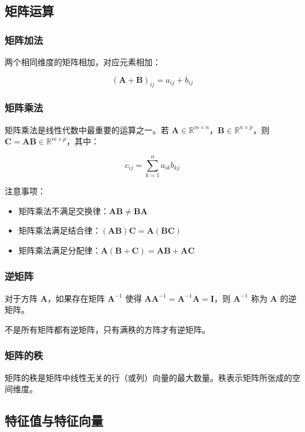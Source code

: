 \documentclass[12pt,UTF8]{ctexbook}
\begin{document}
\subsection{矩阵运算}

\subsubsection{矩阵加法}

两个相同维度的矩阵相加，对应元素相加：

$$(\mathbf{A} + \mathbf{B})_{ij} = a_{ij} + b_{ij}$$

\subsubsection{矩阵乘法}

矩阵乘法是线性代数中最重要的运算之一。若 $\mathbf{A} \in \mathbb{R}^{m \times n}$，$\mathbf{B} \in \mathbb{R}^{n \times p}$，则 $\mathbf{C} = \mathbf{A}\mathbf{B} \in \mathbb{R}^{m \times p}$，其中：

$$c_{ij} = \sum_{k=1}^{n} a_{ik}b_{kj}$$

注意事项：
\begin{itemize}[leftmargin=2cm]
    \item 矩阵乘法不满足交换律：$\mathbf{AB} \neq \mathbf{BA}$
    \item 矩阵乘法满足结合律：$(\mathbf{AB})\mathbf{C} = \mathbf{A}(\mathbf{BC})$
    \item 矩阵乘法满足分配律：$\mathbf{A}(\mathbf{B} + \mathbf{C}) = \mathbf{AB} + \mathbf{AC}$
\end{itemize}

\subsubsection{逆矩阵}

对于方阵 $\mathbf{A}$，如果存在矩阵 $\mathbf{A}^{-1}$ 使得 $\mathbf{A}\mathbf{A}^{-1} = \mathbf{A}^{-1}\mathbf{A} = \mathbf{I}$，则 $\mathbf{A}^{-1}$ 称为 $\mathbf{A}$ 的逆矩阵。

不是所有矩阵都有逆矩阵，只有满秩的方阵才有逆矩阵。

\subsubsection{矩阵的秩}

矩阵的秩是矩阵中线性无关的行（或列）向量的最大数量。秩表示矩阵所张成的空间维度。

\subsection{特征值与特征向量}
\end{document}
